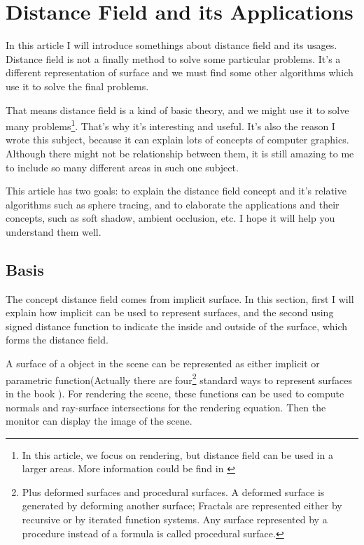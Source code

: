 \part{Distance Field and its Applications}
In this article I will introduce somethings about distance field and its usages. Distance field is not a finally method to solve  some particular problems. It's a different representation of surface and we must find some other algorithms which use it to solve the final problems. 

That means distance field is a kind of basic theory, and we might use it to solve many problems\footnote{In this article, we focus on rendering, but distance field can be used in a larger areas. More information could be find in \cite[10mm]{a:3d-distance-fields-a-survey}}. That's why it's interesting and useful. It's also the reason I wrote this subject, because it can explain lots of concepts of computer graphics. Although there might not be relationship between them, it is still amazing to me to include so many different areas in such one subject.  

This article has two goals: to explain the distance field concept and it's relative algorithms such as sphere tracing, and to elaborate the applications and their concepts, such as soft shadow, ambient occlusion, etc. I hope it will help you understand them well.

\chapter{Basis}
The concept distance field comes from implicit surface. In this section, first I will explain how implicit can be used to represent surfaces, and the second using signed distance function to indicate the inside and outside of the surface, which forms the distance field.    


A surface of a object in the scene can be represented as either implicit or parametric function(Actually there are four\footnote{Plus deformed surfaces and procedural surfaces. A deformed surface is generated by deforming another surface; Fractals are represented either by recursive or by iterated function systems. Any surface represented by a procedure instead of a formula is called procedural surface.} standard ways to represent surfaces in the book \cite[10mm]{b:AnIntegratedIntroductiontoCG}). For rendering the scene, these functions can be used to compute normals and ray-surface intersections for the rendering equation. Then the monitor can display the image of the scene.

